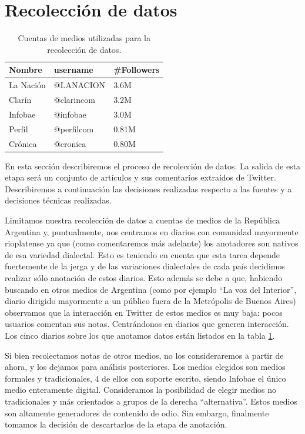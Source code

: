 

\section{Recolección de datos}

\begin{table}[t]
    \centering
    \large
    \begin{tabular}{ lll }
        Nombre     &  username          & \#Followers \\
        \hline
        La Nación  &  @LANACION         & 3.6M            \\
        Clarín     &  @clarincom        & 3.2M        \\
        Infobae    &  @infobae          & 3.0M   \\
        Perfil     &  @perfilcom        & 0.81M    \\
        Crónica    &  @cronica          & 0.80M     \\
        \hline
    \end{tabular}
    \caption{Cuentas de medios utilizadas para la recolección de datos.}
    \label{tab:medios_analizados}
\end{table}


En esta sección describiremos el proceso de recolección de datos. La salida de esta etapa será un conjunto de artículos y sus comentarios extraídos de Twitter. Describiremos a continuación las decisiones realizadas respecto a las fuentes y a decisiones técnicas realizadas.

Limitamos nuestra recolección de datos a cuentas de medios de la República Argentina y, puntualmente, nos centramos en diarios con comunidad mayormente rioplatense ya que (como comentaremos más adelante) los anotadores son nativos de esa variedad dialectal. Esto es teniendo en cuenta que esta tarea depende fuertemente de la jerga y de las variaciones dialectales de cada país decidimos realizar sólo anotación de estos diarios. Esto además se debe a que, habiendo buscando en otros medios de Argentina (como por ejemplo ``La voz del Interior'', diario dirigido mayormente a un público fuera de la Metrópolis de Buenos Aires) observamos que la interacción en Twitter de estos medios es muy baja: pocos usuarios comentan sus notas.  Centrándonos en diarios que generen interacción. Los cinco diarios sobre los que anotamos datos están listados en la tabla \ref{tab:medios_analizados}.

Si bien recolectamos notas de otros medios, no los consideraremos a partir de ahora, y los dejamos para análisis posteriores. Los medios elegidos son medios formales y tradicionales, 4 de ellos con soporte escrito, siendo Infobae el único medio enteramente digital. Consideramos la posibilidad de elegir medios no tradicionales y más orientados a grupos de la derecha ``alternativa''. Estos medios son altamente generadores de contenido de odio. Sin embargo, finalmente tomamos la decisión de descartarlos de la etapa de anotación.


